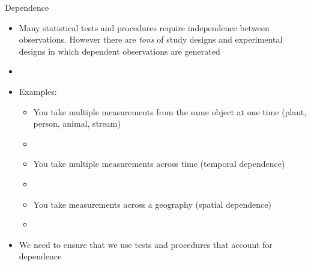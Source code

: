 \documentclass[xcolor=dvipsnames]{beamer}
\begin{document}
\begin{frame}{Dependence}
	\begin{itemize}
		\item Many statistical tests and procedures require independence between observations. However there are \emph{tons} of study designs and experimental designs in which dependent observations are generated
		\item[]
		\item Examples:
		\begin{itemize}
			\item You take multiple measurements from the same object at one time (plant, person, animal, stream)
			\item[]
			\item You take multiple measurements across time (temporal dependence)
			\item[]
			\item You take measurements across a geography (spatial dependence)
			\item[]
		\end{itemize}
	\item We need to ensure that we use tests and procedures that account for dependence
	\end{itemize}
\end{frame}
\end{document}

